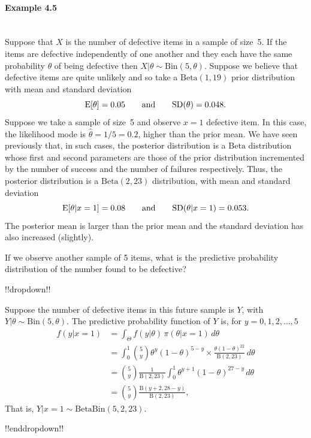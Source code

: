 \paragraph{Example 4.5}{~\\
Suppose that $X$ is the number of defective items in a sample of
size~5. If the items are defective independently of one another and
they each have the same probability $\theta$ of being defective then
$X|\theta\sim \mathrm{Bin}(5,\theta)$. Suppose we believe that defective items
are quite unlikely and so take a $\mathrm{Beta}(1,19)$ prior distribution with
mean and standard deviation
\begin{equation*}
\text{E}[\theta]=0.05\quad\quad\text{and}\quad\quad \textnormal{SD}(\theta)=0.048.
\end{equation*}
Suppose we take a sample of size~5 and observe $x=1$ defective item.
In this case, the likelihood mode is $\hat{\theta}=1/5=0.2$, higher than
the prior mean. We have seen previously that, in such cases, the
posterior distribution is a $\mathrm{Beta}$ distribution whose first and second
parameters are those of the prior distribution incremented by the
number of success and the number of failures respectively. Thus, the
posterior distribution is a $\mathrm{Beta}(2,23)$ distribution, with mean and
standard deviation
$$
\text{E}[\theta|x=1]=0.08\quad\quad\text{and}\quad\quad \textnormal{SD}(\theta|x=1)=0.053.
$$
The posterior mean is larger than the prior mean and the standard
deviation has also increased (slightly).

If we observe another sample of 5 items, what is the predictive
probability distribution of the number found to be defective?

\clearpage

!!dropdown!!

Suppose the number of defective items in this future sample is $Y$, with $Y|\theta\sim \mathrm{Bin}(5,\theta)$. The predictive probability function of $Y$ is, for $y=0,1,2,\ldots,5$
    \begin{align*}
    f(y|x=1)
    &=\int_\Theta f(y|\theta)\,\pi(\theta|x=1)\,d\theta \\
    &=\int_0^1 \binom{5}{y}\theta^y(1-\theta)^{5-y}
    \times \frac{\theta(1-\theta)^{22}}{\mathrm{B}(2,23)}\,d\theta \\
    &=\binom{5}{y}\frac{1}{\mathrm{B}(2,23)}
    \int_0^1 \theta^{y+1}(1-\theta)^{27-y}\,d\theta \\
    &=\binom{5}{y}\frac{\mathrm{B}(y+2,28-y)}{\mathrm{B}(2,23)},
    \end{align*}
    That is, $Y|x=1\sim \mathrm{BetaBin}(5,2,23)$.

!!enddropdown!!}

